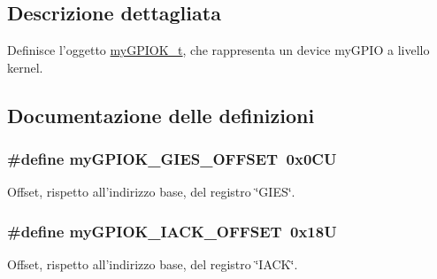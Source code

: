 \subsection{Descrizione dettagliata}
Definisce l'oggetto \hyperlink{structmy_g_p_i_o_k__t}{my\+G\+P\+I\+O\+K\+\_\+t}, che rappresenta un device my\+G\+P\+I\+O a livello kernel. 



\subsection{Documentazione delle definizioni}
\hypertarget{group__my_g_p_i_o_k__t_ga0da2526ca3cd1a94ebcecf96778ea2e5}{
\subsubsection[{my\+G\+P\+I\+O\+K\+\_\+\+G\+I\+E\+S\+\_\+\+O\+F\+F\+S\+E\+T}]{\setlength{\rightskip}{0pt plus 5cm}\#define my\+G\+P\+I\+O\+K\+\_\+\+G\+I\+E\+S\+\_\+\+O\+F\+F\+S\+E\+T~0x0\+C\+U}}\label{group__my_g_p_i_o_k__t_ga0da2526ca3cd1a94ebcecf96778ea2e5}


Offset, rispetto all'indirizzo base, del registro \char`\"{}\+G\+I\+E\+S\char`\"{}. 

\hypertarget{group__my_g_p_i_o_k__t_gac72408c288009c213c0231973b3fe761}{
\subsubsection[{my\+G\+P\+I\+O\+K\+\_\+\+I\+A\+C\+K\+\_\+\+O\+F\+F\+S\+E\+T}]{\setlength{\rightskip}{0pt plus 5cm}\#define my\+G\+P\+I\+O\+K\+\_\+\+I\+A\+C\+K\+\_\+\+O\+F\+F\+S\+E\+T~0x18\+U}}\label{group__my_g_p_i_o_k__t_gac72408c288009c213c0231973b3fe761}


Offset, rispetto all'indirizzo base, del registro \char`\"{}\+I\+A\+C\+K\char`\"{}. 

